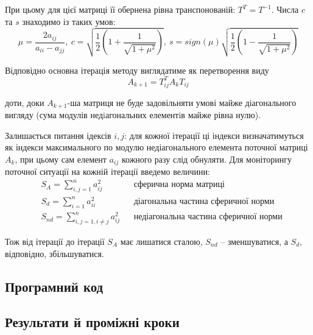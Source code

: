 \documentclass[a4paper,14pt]{extarticle} %
\begin{document}
При цьому для цієї матриці її обернена рівна транспонованій: $T^T=T^{-1}$. Числа $c$ та $s$ знаходимо із таких умов:
\[ \mu=\frac{2a_{ij}}{a_{ii}-a_{jj}},\ c=\sqrt{\frac{1}{2}\left(1+\frac{1}{\sqrt{1+\mu^2}}\right)},
\ s=sign(\mu)\sqrt{\frac{1}{2}\left(1-\frac{1}{\sqrt{1+\mu^2}}\right)} \]

Відповідно основна ітерація методу виглядатиме як перетворення виду 
\[ A_{k+1}=T_{ij}^TA_{k}T_{ij} \]

доти, доки $A_{k+1}$-ша матриця не буде задовільняти умові майже діагонального вигляду (сума модулів 
недiагональних елементiв майже рівна нулю).

\newpage
Залишається питання ідексів $i,j$: для кожної ітерації ці індекси визначатимуться як індекси максимального по 
модулю недіагонального елемента поточної матриці $A_{k}$, при цьому сам елемент $a_{ij}$ кожного разу слід 
обнуляти. Для моніторингу поточної ситуації на кожній ітерації введемо величини:
\begin{align*}
    &S_A=\sum\limits_{i,j=1}^n a_{ij}^2 && \text{сферична норма матриці} \\
    &S_d=\sum\limits_{i=1}^n a_{ii}^2 && \text{діагональна частина сферичної норми} \\
    &S_{nd}=\sum\limits_{i,j=1,i\neq j}^n a_{ij}^2 && \text{недіагональна частина сферичної норми}
\end{align*}

Тож від ітерації до ітерації $S_A$ має лишатися сталою, $S_{nd}$ -- зменшуватися, а $S_{d}$, відповідно, збільшуватися.

\subsection*{Програмний код}



\newpage
\subsection*{Результати й проміжні кроки}
\end{document}
